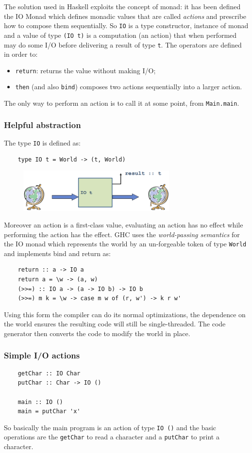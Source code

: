 The solution used in Haskell exploits the concept of monad: it has been defined the IO Monad which defines monadic values that are called \emph{actions} and prescribe how to compose them sequentially.
So \verb|IO| is a type constructor, instance of monad and a value of type \verb|(IO t)| is a computation (an action) that when performed may do some I/O before delivering a result of type \verb|t|.
The operators are defined in order to:
\begin{itemize}
    \item \verb|return|: returns the value without making I/O;
    \item \verb|then| (and also \verb|bind|) composes two actions sequentially into a larger action.
\end{itemize}
The only way to perform an action is to call it at some point, from \verb|Main.main|.

\subsubsection{Helpful abstraction}
The type \verb|IO| is defined as:
\begin{verbatim}
    type IO t = World -> (t, World)
\end{verbatim}
\begin{figure}[H]
    \centering
    \includegraphics[width=300px]{images/7_Functional_Programming/IO_action.png}
\end{figure}
Moreover an action is a first-class value, evaluating an action has no effect while performing the action has the effect.
GHC uses the \emph{world-passing semantics} for the IO monad which represents the world by an un-forgeable token of type \verb|World| and implements bind and return as:
\begin{verbatim}
    return :: a -> IO a
    return a = \w -> (a, w)
    (>>=) :: IO a -> (a -> IO b) -> IO b
    (>>=) m k = \w -> case m w of (r, w') -> k r w'
\end{verbatim}
Using this form the compiler can do its normal optimizations, the dependence on the world ensures the resulting code will still be single-threaded.
The code generator then converts the code to modify the world in place.

\subsubsection{Simple I/O actions}
\begin{verbatim}
    getChar :: IO Char
    putChar :: Char -> IO ()

    main :: IO ()
    main = putChar 'x'
\end{verbatim}
So basically the main program is an action of type \verb|IO ()| and the basic operations are the \verb|getChar| to read a character and a \verb|putChar| to print a character.

